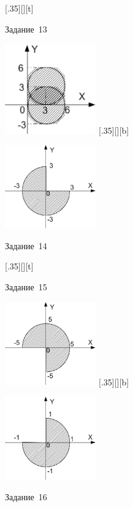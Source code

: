 \begin{figure}[H]
\begin{floatrow}
[.35\textwidth][\FBheight][t]
{\caption{Задание~13}
\label{ch03:refDrawing75}}
{\includegraphics[width=0.35\textwidth,keepaspectratio]{img/ris_3_76}}%
%
[.35\textwidth][\FBheight][b]
{\caption{Задание~14}
\label{ch03:refDrawing76}}
{\includegraphics[width=0.35\textwidth]{img/ris_3_77}}
\end{floatrow}
\end{figure}

\begin{figure}[H]
\begin{floatrow}
[.35\textwidth][\FBheight][t]
{\caption{Задание~15}
\label{ch03:refDrawing77}}
{\includegraphics[width=0.35\textwidth,keepaspectratio]{img/ris_3_78}}%
%
[.35\textwidth][\FBheight][b]
{\caption{Задание~16}
\label{ch03:refDrawing78}}
{\includegraphics[width=0.35\textwidth]{img/ris_3_79}}
\end{floatrow}
\end{figure}

